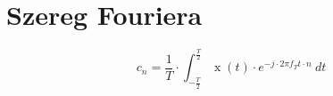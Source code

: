 \section*{Szereg Fouriera}

\begin{equation*}
    c_n = \frac{1}{T} \cdot
    \int_{-\frac{T}{2}}^{\frac{T}{2}}
    \operatorname{x}(t) \cdot 
    e ^ {-j \cdot 2\pi f_T t \cdot n}\ dt
\end{equation*}